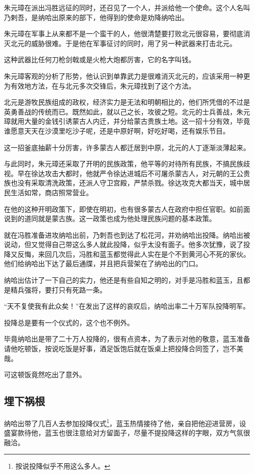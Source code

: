 \begin{multicols}{\theparacolNo}
		朱元璋在派出冯胜远征的同时，还召见了一个人，并派给他一个使命。这个人名叫乃剌吾，是纳哈出原来的部下，他得到的使命是劝降纳哈出。

		朱元璋在军事上从来都不是一个蛮干的人，他很清楚要打败北元很容易，要彻底消灭北元的威胁很难。于是他在军事征讨的同时，用了另一种武器来打击北元。

		这种武器比任何刀枪剑戟或是火枪大炮都厉害，它的名字叫钱。

		朱元璋客观的分析了形势，他认识到单靠武力是很难消灭北元的，应该采用一种更为有效地方法，在与北元多次交锋后，朱元璋找到了这个方法。

		北元是游牧民族组成的政权，经济实力是无法和明朝相比的，他们所凭借的不过是英勇善战的传统而已。既然如此，就以己之长，攻彼之短。北元的士兵善战，朱元璋就用大量的金钱引诱蒙古人内迁，并分给蒙古贵族土地。这一招十分有效，毕竟谁愿意天天在沙漠里吃沙子呢，还是中原好啊，好吃好喝，还有娱乐节目。

		这一招釜底抽薪十分厉害，许多蒙古人都迁居到中原，北元的人丁逐渐淡薄起来。

		与此同时，朱元璋还采取了开明的民族政策，他平等的对待所有民族，不搞民族歧视。早在徐达攻击大都时，他就严令徐达进城后不可屠杀蒙古人，对元朝的王公贵族也没有采取清洗政策，还派人守卫宫殿，严禁杀戮。徐达攻克大都当天，城中居民生活如常，商店照常营业。

		在他的这种开明政策下，即使在明初，也有很多蒙古人在政府中担任官职。如前面说到的道同就是蒙古族。这一政策也成为他处理民族问题的基本政策。

		就在冯胜准备进攻纳哈出前，乃刺吾也到达了松花河，并劝纳哈出投降。纳哈出被说动，但又觉得自己带这么多人就此投降，似乎太没有面子。他多次犹豫，说了投降又反悔，来回几次后，冯胜和蓝玉都觉得此人实在是个不到黄河心不死的家伙。他们给纳哈出下达了最后通牒，并且把兵营架在了纳哈出的门口。

		纳哈出估计了一下自己的实力，他还是有些自知之明的，对手是冯胜和蓝玉，且都是精兵强将，要打只有死路一条。

		“天不复使我有此众矣！”在发出了这样的哀叹后，纳哈出率二十万军队投降明军。

		投降总是要有一个仪式的，这个也不例外。

		毕竟纳哈出是带了二十万人投降的，很有点资本，为了表示对他的敬意，蓝玉准备请他吃顿饭，按说吃饭是好事，酒足饭饱后就在饭桌上把投降合同签了，岂不美哉。

		可这顿饭竟然吃出了意外。

		\subsection{埋下祸根}
		纳哈出带了几百人去参加投降仪式\footnote{按说投降似乎不用这么多人。}，蓝玉热情接待了他，亲自把他迎进营房，设盛宴款待他，蓝玉也很注意给对方留面子，尽量不提投降这样的字眼，双方气氛很融洽。


\end{multicols}
